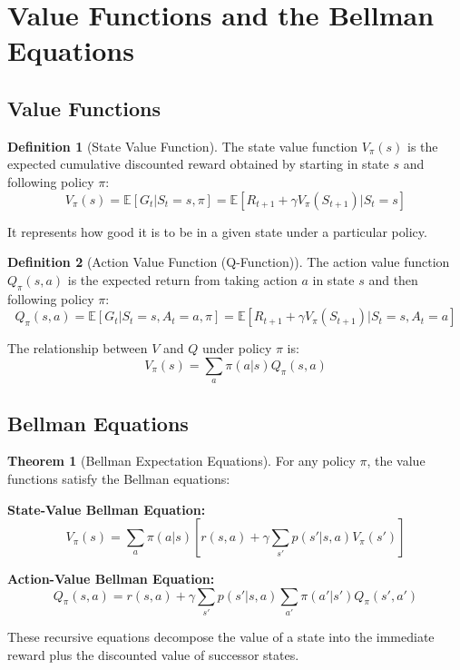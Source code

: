 \documentclass[12pt,a4paper]{article}
\theoremstyle{definition}
\newtheorem{definition}{Definition}[section]
\newtheorem{theorem}{Theorem}[section]
\begin{document}
\section{Value Functions and the Bellman Equations}

\subsection{Value Functions}

\begin{definition}[State Value Function]
The state value function $V_\pi(s)$ is the expected cumulative discounted reward obtained by starting in state $s$ and following policy $\pi$:
\[
V_\pi(s) = \mathbb{E}[G_t | S_t = s, \pi] = \mathbb{E}[R_{t+1} + \gamma V_\pi(S_{t+1}) | S_t = s]
\]

It represents how good it is to be in a given state under a particular policy.
\end{definition}

\begin{definition}[Action Value Function (Q-Function)]
The action value function $Q_\pi(s, a)$ is the expected return from taking action $a$ in state $s$ and then following policy $\pi$:
\[
Q_\pi(s, a) = \mathbb{E}[G_t | S_t = s, A_t = a, \pi] = \mathbb{E}[R_{t+1} + \gamma V_\pi(S_{t+1}) | S_t = s, A_t = a]
\]

The relationship between $V$ and $Q$ under policy $\pi$ is:
\[
V_\pi(s) = \sum_a \pi(a|s) Q_\pi(s, a)
\]
\end{definition}

\subsection{Bellman Equations}

\begin{theorem}[Bellman Expectation Equations]
For any policy $\pi$, the value functions satisfy the Bellman equations:

\textbf{State-Value Bellman Equation:}
\[
V_\pi(s) = \sum_a \pi(a | s) \left[ r(s, a) + \gamma \sum_{s'} p(s' | s, a) V_\pi(s') \right]
\]

\textbf{Action-Value Bellman Equation:}
\[
Q_\pi(s, a) = r(s, a) + \gamma \sum_{s'} p(s' | s, a) \sum_{a'} \pi(a' | s') Q_\pi(s', a')
\]

These recursive equations decompose the value of a state into the immediate reward plus the discounted value of successor states.
\end{theorem}
\end{document}
